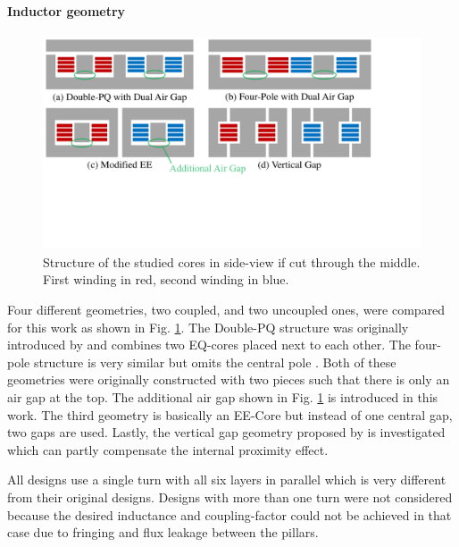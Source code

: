 \documentclass{IPEC2026}
\begin{document}
\paragraph{Inductor geometry}
\begin{figure}
  \includegraphics[page=1, trim = 0cm 6.8cm 4.5cm 0cm, clip, width=\columnwidth]{figures/IPEC_Figures_PowerPoint.pdf}
  \caption{Structure of the studied cores in side-view if cut through the middle. First winding in red, second winding in blue.}
  \label{fig:Core_Drawings}
\end{figure}
Four different geometries, two coupled, and two uncoupled ones, were compared for this work as shown in Fig. \ref{fig:Core_Drawings}. The Double-PQ structure was originally introduced by \cite{wangPCBWindingBasedCoupled2023} and combines two EQ-cores placed next to each other. The four-pole structure is very similar but omits the central pole \cite{huaUltrathinCoupledInductor2021}. Both of these geometries were originally constructed with two pieces such that there is only an air gap at the top. The additional air gap shown in Fig. \ref{fig:Core_Drawings} is introduced in this work.
The third geometry is basically an EE-Core but instead of one central gap, two gaps are used. Lastly, the vertical gap geometry proposed by \cite{schaferNovelHighlyEfficient2020} is investigated which can partly compensate the internal proximity effect. %
\par All designs use a single turn with all six layers in parallel which is very different from their original designs. %
Designs with more than one turn were not considered because the desired inductance and coupling-factor could not be achieved in that case due to fringing and flux leakage between the pillars.
\end{document}

